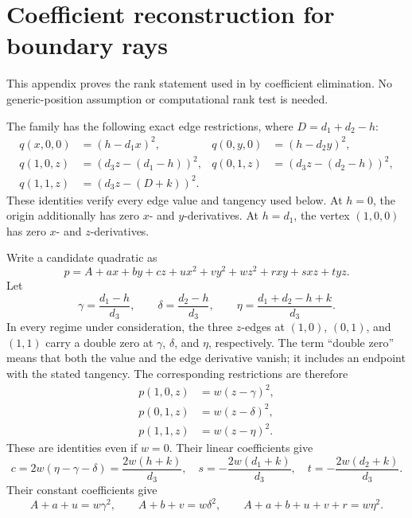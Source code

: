 \section{Coefficient reconstruction for boundary rays}
\label{app:three-boundary}

This appendix proves the rank statement used in
 by coefficient elimination. No generic-position
assumption or computational rank test is needed.

The family has the following exact edge restrictions, where
$D=d_1+d_2-h$:
\[
\begin{aligned}
 q(x,0,0)&=(h-d_1x)^2,&q(0,y,0)&=(h-d_2y)^2,\\
 q(1,0,z)&=(d_3z-(d_1-h))^2,&
 q(0,1,z)&=(d_3z-(d_2-h))^2,\\
 q(1,1,z)&=(d_3z-(D+k))^2.
\end{aligned}
\]
These identities verify every edge value and tangency used below.
At $h=0$, the origin additionally has zero $x$- and $y$-derivatives.
At $h=d_1$, the vertex $(1,0,0)$ has zero $x$- and $z$-derivatives.

Write a candidate quadratic as
\begin{equation}\label{eq:three:candidate}
 p=A+a x+b y+c z+u x^2+v y^2+w z^2+rxy+sxz+tyz.
\end{equation}
Let
\[
 \gamma=\frac{d_1-h}{d_3},\qquad
 \delta=\frac{d_2-h}{d_3},\qquad
 \eta=\frac{d_1+d_2-h+k}{d_3}.
\]
In every regime under consideration, the three $z$-edges at $(1,0)$,
$(0,1)$, and $(1,1)$ carry a double zero at $\gamma$, $\delta$, and $\eta$,
respectively. The term ``double zero'' means that both the value and the
edge derivative vanish; it includes an endpoint with the stated
tangency. The corresponding restrictions are therefore
\begin{align}
 p(1,0,z)&=w(z-\gamma)^2,\label{eq:three:edge-c}\\
 p(0,1,z)&=w(z-\delta)^2,\label{eq:three:edge-d}\\
 p(1,1,z)&=w(z-\eta)^2.\label{eq:three:edge-e}
\end{align}
These are identities even if $w=0$. Their linear coefficients give
\begin{equation}\label{eq:three:z-coefficients}
 c=2w(\eta-\gamma-\delta)=\frac{2w(h+k)}{d_3},
 \quad s=-\frac{2w(d_1+k)}{d_3},
 \quad t=-\frac{2w(d_2+k)}{d_3}.
\end{equation}
Their constant coefficients give
\begin{equation}\label{eq:three:edge-constants}
 A+a+u=w\gamma^2,\qquad A+b+v=w\delta^2,
 \qquad A+a+b+u+v+r=w\eta^2.
\end{equation}

